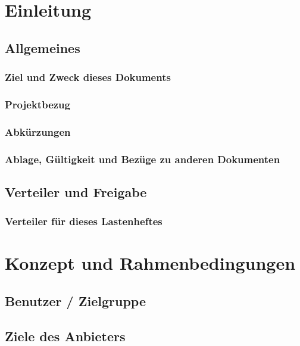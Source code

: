 \documentclass[10pt,a4paper]{article}
\begin{document}
    \maketitle
    \newpage
    \tableofcontents
    \newpage

    \section{Einleitung}
    \subsection{Allgemeines}
    \subsubsection{Ziel und Zweck dieses Dokuments}
    \subsubsection{Projektbezug}
    \subsubsection{Abkürzungen}
    \subsubsection{Ablage, Gültigkeit und Bezüge zu anderen Dokumenten}
    \subsection{Verteiler und Freigabe}
    \subsubsection{Verteiler für dieses Lastenheftes}
    \section{Konzept und Rahmenbedingungen}
    \subsection{Benutzer / Zielgruppe}
    \subsection{Ziele des Anbieters}
\end{document}
